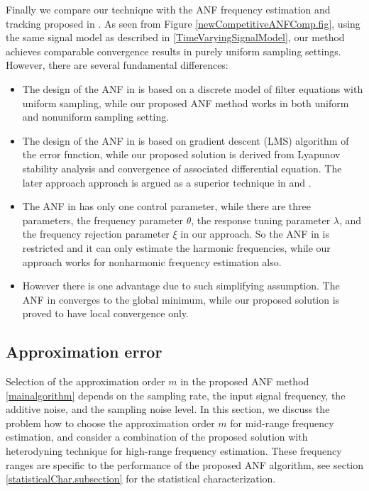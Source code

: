 \documentclass{UCF_ETD}
\begin{document}
 Finally we compare our technique with the  ANF frequency estimation and tracking proposed in \cite{tanjiang09}.
 As seen from Figure \ref{newCompetitiveANFComp.fig},  using the same signal model as described in \eqref{TimeVaryingSignalModel},
 our method achieves comparable convergence results in purely uniform sampling settings.
 However, there are several fundamental differences:
 \begin{itemize}
 \item  %
  The design of the ANF in \cite{tanjiang09} is based on a discrete model of filter equations with uniform sampling,
 while our proposed ANF method works in both uniform and nonuniform sampling setting.

            \item The design of the
          ANF in \cite{tanjiang09} is based on gradient descent (LMS) algorithm of the error function, while  our proposed solution is derived from Lyapunov stability analysis and convergence of associated differential equation. The later approach approach is argued as
          a superior technique in    \cite{regalia91} and \cite{hsuortegadamm99}.



     \item %
     The ANF in \cite{tanjiang09} has only one control parameter, while there are three parameters, the frequency parameter $\theta$, the response tuning parameter $\lambda$, and the frequency rejection parameter $\xi$
         in our approach.
      So the ANF in \cite{tanjiang09} is restricted and it can only estimate the harmonic frequencies, while
          our approach works for nonharmonic frequency estimation also.

        \item   However there is one advantage due to such simplifying assumption. The  ANF in \cite{tanjiang09}  converges to the global minimum, while our proposed solution is proved to have local convergence only.
     \end{itemize}


\subsection{Approximation error}
\label{approxerror.subsection}
Selection of the approximation order $m$ in the
proposed ANF method  \eqref{mainalgorithm} depends on the sampling rate,
 the input signal frequency, the additive noise, and the  sampling noise level.
  In this section, we 
   discuss the problem how to choose the approximation order $m$  for  mid-range frequency estimation, and
consider a combination of the proposed solution with heterodyning technique for
 high-range frequency estimation.  These frequency ranges are specific to the performance of the proposed ANF algorithm,
   see section \ref{statisticalChar.subsection} for  the statistical characterization.
\end{document}
